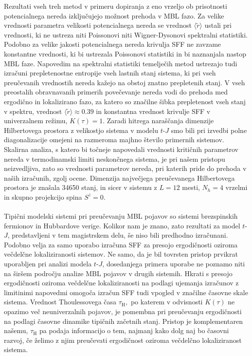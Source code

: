  Rezultati vseh treh metod v primeru dopiranja z eno vrzeljo ob prisotnosti potencialnega nereda izključujejo možnost prehoda v MBL fazo. Za velike vrednosti parametra velikosti potencialnega nereda se vrednost $\langle \tilde{r}\rangle$ ustali pri vrednosti, ki ne ustreza niti Poissonovi niti Wigner-Dysonovi spektralni statistiki. Podobno za velike jakosti potencialnega nereda krivulja SFF ne zavzame konstantne vrednosti, ki bi ustrezala Poissonovi statistiki in bi naznanjala nastop MBL faze. Napovedim na spektralni statistiki temelječih metod ustrezajo tudi izračuni prepletenostne entropije vseh lastnih stanj sistema, ki pri vseh preučevanih vrednostih nereda kažejo na obstoj znatno prepletenih stanj. V vseh preostalih obravnavanih primerih povečevanje nereda vodi do prehoda med ergodično in lokalizirano fazo, za katero so značilne šibka prepletenost vseh stanj v spektru, vrednost $\langle \tilde{r}\rangle \approx 0.39$ in konstantna vrednost krivulje SFF v univerzalnem režimu, $K(\tau)=1.$ Zaradi hitrega naraščanja dimenzije Hilbertovega prostora z velikostjo sistema v modelu $t$-$J$ smo bili pri izvedbi polne diagonalizacije omejeni na razmeroma majhno število primernih sistemov. Skalirna analiza, s katero bi točneje napovedali vrednosti kritičnih parametrov nereda v termodinamski limiti neskončnega sistema, je pri našem pristopu neizvedljiva, zato so vrednosti parametrov nereda, pri katerih pride do prehoda v naših izračunih, zgolj ocene. Dimenzija največjega preučevanega Hilbertovega prostora je znašala 34650 stanj, in sicer v sistemu z $L=12$ mesti, $N_h=4$ vrzelmi in skupno projekcijo spina $S^z=0.$\\\\
 Tipični modelski sistemi pri preučevanju MBL pojavov so sistemi brezspinskih fermionov in Hubbardove verige. Kolikor nam je znano, zato rezultati za model $t$-$J$, predstavljeni v tem magistrskem delu, še niso bili predhodno izračunani. Podobno velja za samo uporabo izračuna SFF za presojo ergodičnosti oziroma večdelčne lokaliziranosti sistemov. Ne samo, da je bil tovrsten pristop prvikrat uporabljen pri analizi modela $t$-$J$, dosedanjega primera uporabe ne poznamo niti na širšem področju analize MBL pojavov v drugih sistemih. Hkrati s presojo ergodičnosti oziroma večdelčne lokaliziranosti na podlagi ujemanja izračunov z limitinimi napovedmi omogoča izračun SFF tudi vpogled v značilne časovne skale sistema. Vrednost Thoulessovega časa $\tau_\mathrm{H},$ po katerem v odvisnosti $K(\tau)$ ne opazimo več neuniverzalnih pojavov, je pomembna pri preučevanju ergodičnosti na podlagi časovne dinamike tipičnih začetnih stanj. Pristop je komplementaren našemu, $\tau_\mathrm{H}$ pa podaja informacijo o tem, najmanj kako dolg naj bo časovni razvoj, če želimo z njim preučevati ergodičnost oziroma večdelčno lokaliziranost sistema. \\\\
